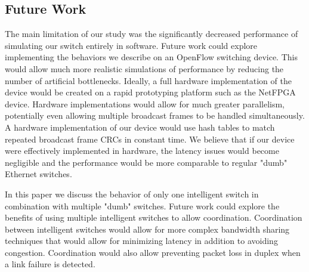   \subsection{Future Work}
    The main limitation of our study was the significantly decreased performance of simulating our switch entirely in software.
    Future work could explore implementing the behaviors we describe on an OpenFlow switching device.
    This would allow much more realistic simulations of performance by reducing the number of artificial bottlenecks.
    Ideally, a full hardware implementation of the device would be created on a rapid prototyping platform such as the NetFPGA device.
    Hardware implementations would allow for much greater parallelism, potentially even allowing multiple broadcast frames to be handled simultaneously.
    A hardware implementation of our device would use hash tables to match repeated broadcast frame CRCs in constant time.
    We believe that if our device were effectively implemented in hardware, the latency issues would become negligible and the performance would be more comparable to regular "dumb" Ethernet switches.

    In this paper we discuss the behavior of only one intelligent switch in combination with multiple "dumb" switches.
    Future work could explore the benefits of using multiple intelligent switches to allow coordination.
    Coordination between intelligent switches would allow for more complex bandwidth sharing techniques that would allow for minimizing latency in addition to avoiding congestion.
    Coordination would also allow preventing packet loss in duplex when a link failure is detected.
